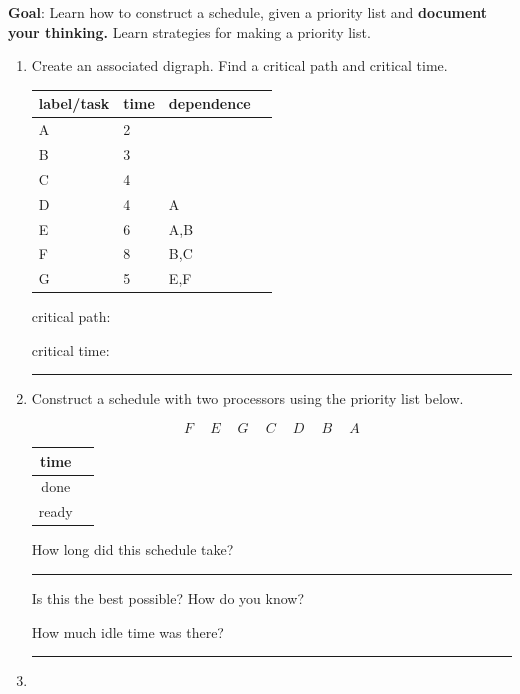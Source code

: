 \documentclass[12pt]{article}
\renewcommand{\emph}[1]{\textsf{\textbf{#1}}}
\newcommand{\ans}[1][1in]{\rule{#1}{.5pt}}
\begin{document}
\emph{Goal}: Learn how to construct a schedule, given a priority list and \emph{document your thinking.} Learn strategies for making a priority list.\\

\begin{enumerate}
\item Create an associated digraph. Find a critical path and critical time.\\

\begin{tabular}{llll}
label/task&time&dependence\\
\hline
A&2&\\
B&3&\\
C&4&\\
D&4&A\\
E&6&A,B\\
F&8&B,C\\
G&5&E,F\\
\end{tabular}

critical path: \hrulefill

critical time: \ans


\item Construct a schedule with two processors using the priority list below. 

$$F \:\quad E \:\quad G \:\quad C \:\quad D \:\quad B \: \quad A$$

\vspace{.1in}


\hspace*{-1in}	\begin{tabular}{c || c}
time &   \quad \hspace{6in} \quad \\ \hline
done& \\ \hline
ready& \\ \hline
\end{tabular}


How long did this schedule take? \ans

Is this the best possible? How do you know? 

\vfill

How much idle time was there? \ans



\vspace{1cm}

\item {}
\vfill

\vfill
\end{enumerate}
\end{document}
